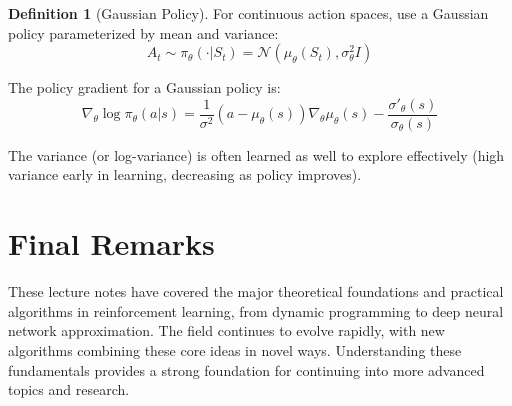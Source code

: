 \documentclass[12pt,a4paper]{article}
\theoremstyle{definition}
\newtheorem{definition}{Definition}[section]
\begin{document}
\begin{definition}[Gaussian Policy]
For continuous action spaces, use a Gaussian policy parameterized by mean and variance:
\[
A_t \sim \pi_\theta(\cdot | S_t) = \mathcal{N}(\mu_\theta(S_t), \sigma_\theta^2 I)
\]

The policy gradient for a Gaussian policy is:
\[
\nabla_\theta \log \pi_\theta(a|s) = \frac{1}{\sigma^2} (a - \mu_\theta(s)) \nabla_\theta \mu_\theta(s) - \frac{\sigma'_\theta(s)}{\sigma_\theta(s)}
\]

The variance (or log-variance) is often learned as well to explore effectively (high variance early in learning, decreasing as policy improves).
\end{definition}

\section{Final Remarks}

These lecture notes have covered the major theoretical foundations and practical algorithms in reinforcement learning, from dynamic programming to deep neural network approximation. The field continues to evolve rapidly, with new algorithms combining these core ideas in novel ways. Understanding these fundamentals provides a strong foundation for continuing into more advanced topics and research.
\end{document}
